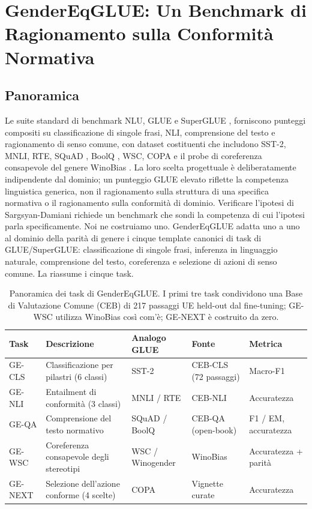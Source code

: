 \documentclass[pdflatex, sn-apa]{sn-jnl}%
\theoremstyle{thmstyleone}%
\theoremstyle{thmstyletwo}%
\theoremstyle{thmstylethree}%
\begin{document}
\section{GenderEqGLUE: Un Benchmark di Ragionamento sulla Conformità Normativa}
\label{sec:benchmark}

\subsection{Panoramica}
\label{sec:bench:overview}

Le suite standard di benchmark NLU, GLUE \citep{wang2018glue} e SuperGLUE
\citep{wang2019superglue}, forniscono punteggi compositi su classificazione di
singole frasi, NLI, comprensione del testo e ragionamento di senso comune, con
dataset costituenti che includono SST-2, MNLI, RTE, SQuAD
\citep{rajpurkar2016squad}, BoolQ \citep{clark2019boolq}, WSC, COPA
\citep{roemmele2011copa} e il probe di coreferenza consapevole del genere
WinoBias \citep{zhao2018winobias}. La loro scelta progettuale è deliberatamente
indipendente dal dominio; un punteggio GLUE elevato riflette la competenza
linguistica generica, non il ragionamento sulla struttura di una specifica
normativa o il ragionamento sulla conformità di dominio. Verificare l'ipotesi di
Sargsyan-Damiani richiede un benchmark che sondi la competenza di cui l'ipotesi
parla specificamente. Noi ne costruiamo uno. GenderEqGLUE adatta uno a uno al
dominio della parità di genere i cinque template canonici di task di
GLUE/SuperGLUE: classificazione di singole frasi, inferenza in linguaggio
naturale, comprensione del testo, coreferenza e selezione di azioni di senso
comune. La  riassume i cinque task.


\begin{table}[h]
\centering
\caption{Panoramica dei task di GenderEqGLUE. I primi tre task condividono una
Base di Valutazione Comune (CEB) di 217 passaggi UE held-out dal fine-tuning;
GE-WSC utilizza WinoBias \citep{zhao2018winobias} così com'è; GE-NEXT è costruito
da zero.}
\label{tab:tasks}
\small
\begin{tabularx}{\linewidth}{@{}lXllX@{}}
\toprule
Task    & Descrizione                          & Analogo GLUE   & Fonte
& Metrica                       \\
\midrule
GE-CLS  & Classificazione per pilastri (6 classi) & SST-2        & CEB-CLS (72
passaggi)                  & Macro-F1                     \\
GE-NLI  & Entailment di conformità (3 classi)  & MNLI / RTE      & CEB-NLI
                   & Accuratezza                  \\
GE-QA   & Comprensione del testo normativo     & SQuAD / BoolQ   & CEB-QA
(open-book)                  & F1 / EM, accuratezza         \\
GE-WSC  & Coreferenza consapevole degli stereotipi & WSC / Winogender& WinoBias
& Accuratezza + parità         \\
GE-NEXT & Selezione dell'azione conforme (4 scelte)& COPA         & Vignette
curate                       & Accuratezza                  \\
\bottomrule
\end{tabularx}
\end{table}
\end{document}
